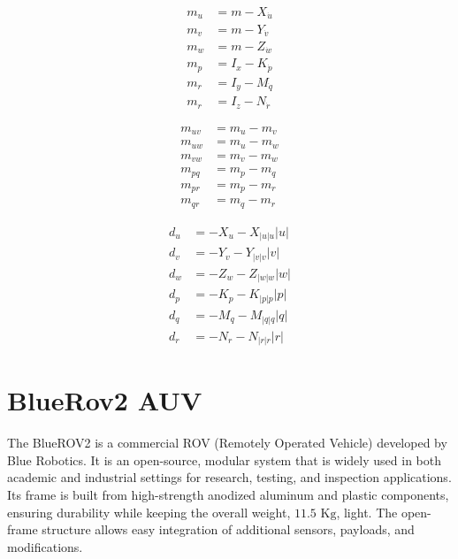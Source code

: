 \begin{minipage}[t]{0.3\textwidth}
\begin{align*}
    m_u &= m - X_{\dot{u}} \\
    m_v &= m - Y_{\dot{v}} \\
    m_w &= m - Z_{\dot{w}} \\
    m_p &= I_x - K_{\dot{p}} \\
    m_r &= I_y - M_{\dot{q}} \\
    m_r &= I_z - N_{\dot{r}}
\end{align*}
\end{minipage}
\hfill
\begin{minipage}[t]{0.3\textwidth}
\begin{align*}
    m_{uv} &= m_u - m_v \\
    m_{uw} &= m_u - m_w \\
    m_{vw} &= m_v - m_w \\
    m_{pq} &= m_p - m_q \\
    m_{pr} &= m_p - m_r \\
    m_{qr} &= m_q - m_r
\end{align*}
\end{minipage}
\hfill
\begin{minipage}[t]{0.3\textwidth}
\begin{align*}
    d_u &= -X_u - X_{|u|u}|u| \\
    d_v &= -Y_v - Y_{|v|v}|v| \\
    d_w &= -Z_w - Z_{|w|w}|w| \\
    d_p &= -K_p - K_{|p|p}|p| \\
    d_q &= -M_q - M_{|q|q}|q| \\
    d_r &= -N_r - N_{|r|r}|r|
\end{align*}
\end{minipage}

\section{BlueRov2 AUV}
The BlueROV2 is a commercial ROV (Remotely Operated Vehicle) developed by Blue Robotics. It is an open-source, modular system that is widely used in both academic 
and industrial settings for research, testing, and inspection applications. Its frame is built from high-strength anodized aluminum and plastic components, 
ensuring durability while keeping the overall weight, $11.5 \text{ Kg}$, light. The open-frame structure allows easy integration of additional 
sensors, payloads, and modifications.

